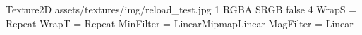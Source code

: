 Texture2D
assets/textures/img/reload_test.jpg
1
RGBA
SRGB
false
4
WrapS = Repeat
WrapT = Repeat
MinFilter = LinearMipmapLinear
MagFilter = Linear